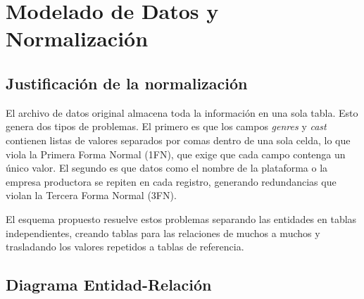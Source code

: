 \documentclass[12pt,a4paper]{article}
\begin{document}
\begin{center}
\end{center}

\newpage
\section*{Modelado de Datos y Normalizaci\'on}

\subsection*{Justificaci\'on de la normalizaci\'on}

El archivo de datos original almacena toda la informaci\'on en una sola tabla. Esto genera dos tipos de problemas. El primero es que los campos \textit{genres} y \textit{cast} contienen listas de valores separados por comas dentro de una sola celda, lo que viola la Primera Forma Normal (1FN), que exige que cada campo contenga un \'unico valor. El segundo es que datos como el nombre de la plataforma o la empresa productora se repiten en cada registro, generando redundancias que violan la Tercera Forma Normal (3FN).

El esquema propuesto resuelve estos problemas separando las entidades en tablas independientes, creando tablas para las relaciones de muchos a muchos y trasladando los valores repetidos a tablas de referencia.

\newpage
\subsection*{Diagrama Entidad-Relaci\'on}

\end{document}
